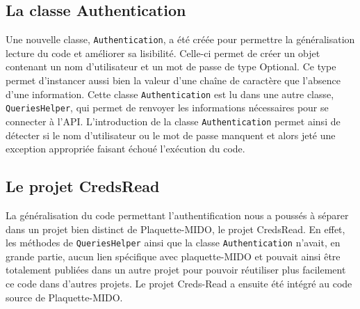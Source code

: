 \subsection{La classe Authentication}

Une nouvelle classe, \texttt{Authentication}, a été créée pour permettre la généralisation lecture du code et améliorer sa lisibilité. Celle-ci permet de créer un objet contenant un nom d'utilisateur et un mot de passe de type Optional. Ce type permet d'instancer aussi bien la valeur d'une chaîne de caractère que l'absence d'une information. Cette classe \texttt{Authentication} est lu dans une autre classe, \texttt{QueriesHelper}, qui permet de renvoyer les informations nécessaires pour se connecter à l'API. L'introduction de la classe \texttt{Authentication} permet ainsi de détecter si le nom d'utilisateur ou le mot de passe manquent et alors jeté une exception appropriée faisant échoué l'exécution du code. 

\subsection{Le projet CredsRead}
La généralisation du code permettant l'authentification nous a poussés à séparer dans un projet bien distinct de Plaquette-MIDO, le projet CredsRead. En effet, les méthodes de \texttt{QueriesHelper} ainsi que la classe \texttt{Authentication} n'avait, en grande partie, aucun lien spécifique avec plaquette-MIDO et pouvait ainsi être totalement publiées dans un autre projet pour pouvoir réutiliser plus facilement ce code dans d'autres projets. Le projet Creds-Read a ensuite été intégré au code source de Plaquette-MIDO.